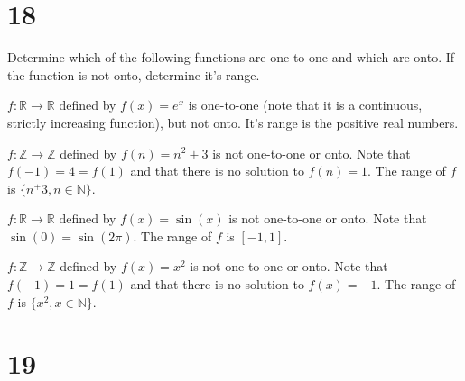 \documentclass[a4paper]{article}
\begin{document}
\section*{18}

Determine which of the following functions are one-to-one and which are onto. If the function is not onto, determine it's range.

\vspace{\baselineskip}

$f : \mathbb{R} \rightarrow \mathbb{R}$ defined by $f(x) = e^x$ is one-to-one (note that it is a continuous, strictly increasing function), but not onto. It's range is the positive real numbers.

\vspace{\baselineskip}

$f : \mathbb{Z} \rightarrow \mathbb{Z}$ defined by $f(n) = n^2 + 3$ is not one-to-one or onto. Note that $f(-1) = 4 = f(1)$ and that there is no solution to $f(n) = 1$. The range of $f$ is $\{ n^ + 3, n \in \mathbb{N} \}$.

\vspace{\baselineskip}

$f : \mathbb{R} \rightarrow \mathbb{R}$ defined by $f(x) = \sin(x)$ is not one-to-one or onto. Note that $\sin(0) = \sin(2\pi)$. The range of $f$ is $[-1, 1]$.

\vspace{\baselineskip}

$f : \mathbb{Z} \rightarrow \mathbb{Z}$ defined by $f(x) = x^2$ is not one-to-one or onto. Note that $f(-1) = 1 = f(1)$ and that there is no solution to $f(x) = -1$. The range of $f$ is $\{ x^2, x \in \mathbb{N}\}$.


\section*{19}
\end{document}
